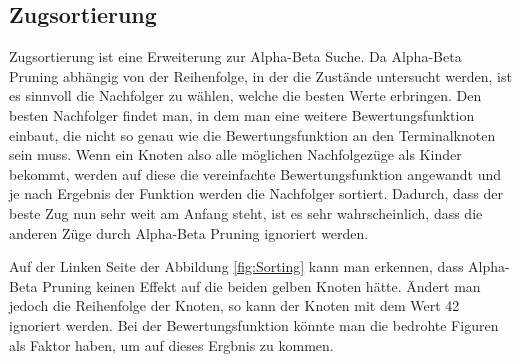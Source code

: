 \documentclass[12pt,a4paper,bibliography=totocnumbered,listof=totocnumbered]{article}
\begin{document}
\subsection{Zugsortierung}
\label{chap:Zugsortierung}
Zugsortierung ist eine Erweiterung zur Alpha-Beta Suche.
Da Alpha-Beta Pruning abhängig von der Reihenfolge, in der die Zustände untersucht werden, ist es sinnvoll
die Nachfolger zu wählen, welche die besten Werte erbringen. Den besten Nachfolger findet man, in dem man eine
weitere Bewertungsfunktion einbaut, die nicht so genau wie die Bewertungsfunktion an den Terminalknoten sein muss. 
Wenn ein Knoten also alle möglichen Nachfolgezüge als Kinder bekommt, werden auf diese die vereinfachte Bewertungsfunktion
angewandt und je nach Ergebnis der Funktion werden die Nachfolger sortiert. Dadurch, dass der beste Zug nun
sehr weit am Anfang steht, ist es sehr wahrscheinlich, dass die anderen Züge durch Alpha-Beta Pruning ignoriert werden.
\cite{KuenstlicheIntelligenzNorvig}

Auf der Linken Seite der Abbildung \ref{fig:Sorting} kann man erkennen, dass Alpha-Beta Pruning keinen Effekt 
auf die beiden gelben Knoten hätte. Ändert man jedoch die Reihenfolge der Knoten, so kann der Knoten mit dem Wert 42
ignoriert werden. Bei der Bewertungsfunktion könnte man die bedrohte Figuren als Faktor haben, um auf dieses Ergbnis zu kommen.
\end{document}
